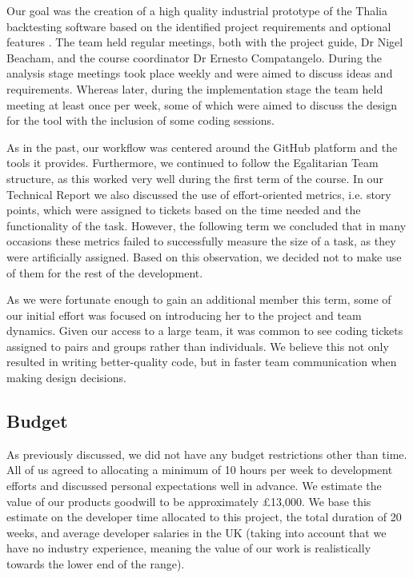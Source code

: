 \documentclass[main.tex]{subfiles}
\begin{document}
Our goal was the creation of a high quality industrial prototype of the Thalia backtesting software based on the identified project requirements \cite{TR_REQS} and optional features \cite{TR_OPTIONAL_FEATURES}. The team held regular meetings, both with the project guide, Dr Nigel Beacham, and the course coordinator Dr Ernesto Compatangelo. During the analysis stage meetings took place weekly and were aimed to discuss ideas and requirements. Whereas later, during the implementation stage the team held meeting at least once per week, some of which were aimed to discuss the design for the tool with the inclusion of some coding sessions.

As in the past\cite{TR_TO}, our workflow was centered around the GitHub platform and the tools it provides.
Furthermore, we continued to follow the Egalitarian Team structure, as this worked very well during the first term of the course.
In our Technical Report \cite{TR_story} we also discussed the use of effort-oriented metrics, i.e. story points, which were assigned to tickets based on the time needed and the functionality of the task.
However, the following term we concluded that in many occasions these metrics failed to successfully measure the size of a task, as they were artificially assigned. Based on this observation, we decided not to make use of them for the rest of the development.

As we were fortunate enough to gain an additional member this term, some of our initial effort was focused on introducing her to the project and team dynamics. Given our access to a large team, it was common to see coding tickets assigned to pairs and groups rather than individuals. We believe this not only resulted in writing better-quality code, but in faster team communication when making design decisions.

\subsection{Budget}
As previously discussed, we did not have any budget restrictions other than time. All of us agreed to allocating a minimum of 10 hours per week to development efforts and discussed personal expectations well in advance.  We estimate the value of our products goodwill to be approximately £13,000. We base this estimate on the developer time allocated to this project, the total duration of 20 weeks, and average developer salaries in the UK\cite{DeveloperSalary} (taking into account that we have no industry experience, meaning the value of our work is realistically towards the lower end of the range).
\end{document}
